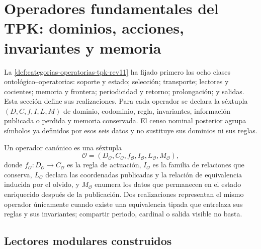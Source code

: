 \section{Operadores fundamentales del TPK: dominios, acciones, invariantes y
memoria}
\label{sec:inventario-operatorio-tpk-rev11}

La \cref{def:categorias-operatorias-tpk-rev11} ha fijado primero las ocho
clases ontológico--operatorias: soporte y estado; selección; transporte;
lectores y cocientes; memoria y frontera; periodicidad y retorno;
prolongación; y salidas. Esta sección define sus realizaciones. Para cada
operador se declara la séxtupla \((D,C,f,I,L,M)\) de dominio, codominio, regla,
invariantes, información publicada o perdida y memoria conservada. El censo
nominal posterior agrupa símbolos ya definidos por esos seis datos y no
sustituye sus dominios ni sus reglas.

\begin{definition}
Un operador canónico es una séxtupla
\[
 \mathcal O=(D_{\mathcal O},C_{\mathcal O},f_{\mathcal O},
 I_{\mathcal O},L_{\mathcal O},M_{\mathcal O}),
\]
donde \(f_{\mathcal O}:D_{\mathcal O}\to C_{\mathcal O}\) es la regla de
actuación, \(I_{\mathcal O}\) es la familia de relaciones que conserva,
\(L_{\mathcal O}\) declara las coordenadas publicadas y la relación de
equivalencia inducida por el olvido, y \(M_{\mathcal O}\) enumera los datos
que permanecen en el estado enriquecido después de la publicación. Dos
realizaciones representan el mismo operador únicamente cuando existe una
equivalencia tipada que entrelaza sus reglas y sus invariantes; compartir
periodo, cardinal o salida visible no basta.
\end{definition}

\subsection{Lectores modulares construidos}

